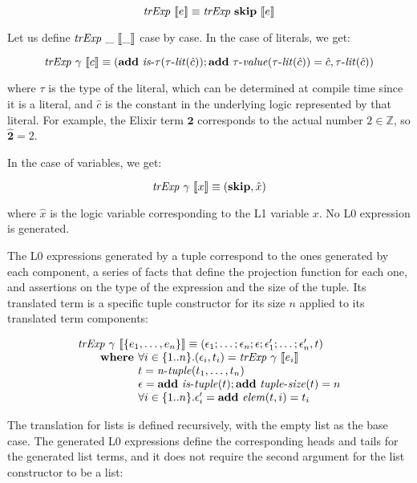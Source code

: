 \[
\mathit{trExp}~\llbracket e\rrbracket \equiv \mathit{trExp}~\textbf{skip}~\llbracket e\rrbracket
\]

Let us define $\mathit{trExp}~\_~\llbracket\_\rrbracket$ case by case. In the case of literals, we get:

\[
\mathit{trExp}~\gamma~\llbracket c\rrbracket \equiv (\textbf{add}~\mathit{is\mbox{-}\tau}(\mathit{\tau\mbox{-}lit}(\hat{c}));\textbf{add}~\mathit{\tau\mbox{-}value}(\mathit{\tau\mbox{-}lit}(\hat{c})) = \hat{c}, \mathit{\tau\mbox{-}lit}(\hat{c}))
\]

where $\tau$ is the type of the literal, which can be determined at compile time
since it is a literal, and $\hat{c}$ is the constant in the underlying logic
represented by that literal. For example, the Elixir term $\mathbf{2}$
corresponds to the actual number $2 \in \mathbb{Z}$, so $\hat{\mathbf{2}} = 2$.

In the case of variables, we get:

\[
\mathit{trExp}~\gamma~\llbracket x\rrbracket \equiv (\textbf{skip}, \hat{x})
\]

where $\hat{x}$ is the logic variable corresponding to the L1 variable $x$. No
L0 expression is generated.

The L0 expressions generated by a tuple correspond to the ones generated by each
component, a series of facts that define the projection function for each one,
and assertions on the type of the expression and the size of the tuple. Its
translated term is a specific tuple constructor for its size $n$ applied to its
translated term components:

\[
\begin{array}{l}
\trExp{\gamma}{\{e_1, \ldots, e_n\}} \equiv (\epsilon_1; \dots; \epsilon_n;\epsilon;\epsilon'_1; \dots; \epsilon'_n, t)\\
\qquad \textbf{where } \forall i \in \{1..n\}. (\epsilon_i, t_i) = \trExp{\gamma}{e_i}\\
\qquad \phantom{\textbf{where }} t = \mathit{n\mbox{-}tuple}(t_1, \ldots, t_n)\\
\qquad \phantom{\textbf{where }} \epsilon = \addE~\istuple{t};\addE~\mathit{tuple\mbox{-}size}(t) = n\\
\qquad \phantom{\textbf{where }} \forall i \in \{1..n\}. \epsilon'_i = \addE~\mathit{elem}(t, i) = t_i\\
\end{array}
\]

The translation for lists is defined recursively, with the empty list as the
base case. The generated L0 expressions define the corresponding heads and tails
for the generated list terms, and it does not require the second argument for
the list constructor to be a list:

